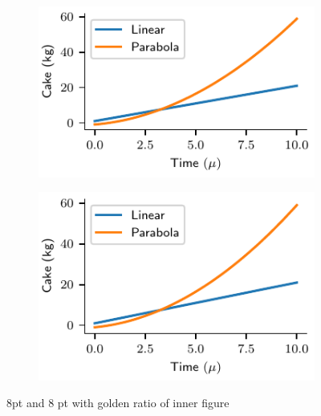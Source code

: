 \documentclass[a4paper,11pt]{report} %
\numberwithin{equation}{section}
\begin{document}
\begin{figure}
	\centering
	\begin{subfigure}{0.49\textwidth}
		\centering
		\includegraphics[width=1\linewidth]{fig/TwoGolden.pdf}
		\caption{}
	\end{subfigure}
	\begin{subfigure}{0.49\textwidth}
		\centering
		\includegraphics[width=1\linewidth]{fig/TwoInnerGolden.pdf}
		\caption{}
	\end{subfigure}
	\caption{8pt and $8$ pt with golden ratio of inner figure}
\end{figure}
\end{document}
